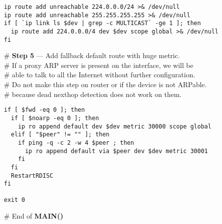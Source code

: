 \begin{verbatim}
ip route add unreachable 224.0.0.0/24 >& /dev/null 
ip route add unreachable 255.255.255.255 >& /dev/null
if [ `ip link ls $dev | grep -c MULTICAST` -ge 1 ]; then
  ip route add 224.0.0.0/4 dev $dev scope global >& /dev/null
fi
\end{verbatim}
\begin{flushleft}
\# {\bf Step 5} --- Add fallback default route with huge metric.\\
\# If a proxy ARP server is present on the interface, we will be\\
\# able to talk to all the Internet without further configuration.\\
\# Do not make this step on router or if the device is not ARPable.\\
\# because dead nexthop detection does not work on them.
\end{flushleft}
\begin{verbatim}
if [ $fwd -eq 0 ]; then
  if [ $noarp -eq 0 ]; then
    ip ro append default dev $dev metric 30000 scope global
  elif [ "$peer" != "" ]; then
    if ping -q -c 2 -w 4 $peer ; then
      ip ro append default via $peer dev $dev metric 30001
    fi
  fi
  RestartRDISC
fi

exit 0
\end{verbatim}
\begin{flushleft}
\# End of {\bf MAIN()}
\end{flushleft}



